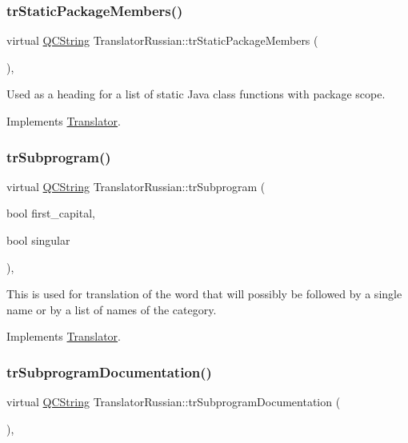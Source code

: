 \subsubsection{\texorpdfstring{trStaticPackageMembers()}{trStaticPackageMembers()}}
{\footnotesize\ttfamily virtual \mbox{\hyperlink{class_q_c_string}{Q\+C\+String}} Translator\+Russian\+::tr\+Static\+Package\+Members (\begin{DoxyParamCaption}{ }\end{DoxyParamCaption})\hspace{0.3cm}{\ttfamily [inline]}, {\ttfamily [virtual]}}

Used as a heading for a list of static Java class functions with package scope. 

Implements \mbox{\hyperlink{class_translator}{Translator}}.

\mbox{\label{class_translator_russian_a79b647935e6075efa24b65f2365d210f}} 
\subsubsection{\texorpdfstring{trSubprogram()}{trSubprogram()}}
{\footnotesize\ttfamily virtual \mbox{\hyperlink{class_q_c_string}{Q\+C\+String}} Translator\+Russian\+::tr\+Subprogram (\begin{DoxyParamCaption}\item[{bool}]{first\+\_\+capital,  }\item[{bool}]{singular }\end{DoxyParamCaption})\hspace{0.3cm}{\ttfamily [inline]}, {\ttfamily [virtual]}}

This is used for translation of the word that will possibly be followed by a single name or by a list of names of the category. 

Implements \mbox{\hyperlink{class_translator}{Translator}}.

\mbox{\label{class_translator_russian_a62046a728fbf8e4a6c372059e6b9c7d0}} 
\subsubsection{\texorpdfstring{trSubprogramDocumentation()}{trSubprogramDocumentation()}}
{\footnotesize\ttfamily virtual \mbox{\hyperlink{class_q_c_string}{Q\+C\+String}} Translator\+Russian\+::tr\+Subprogram\+Documentation (\begin{DoxyParamCaption}{ }\end{DoxyParamCaption})\hspace{0.3cm}{\ttfamily [inline]}, {\ttfamily [virtual]}}

